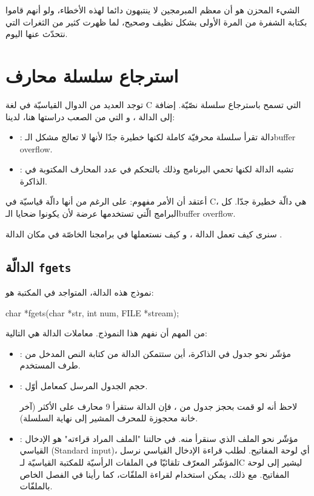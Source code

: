 الشيء المحزن هو أن معظم المبرمجين لا ينتبهون دائما لهذه الأخطاء، ولو أنهم قاموا بكتابة الشفرة من المرة الأولى بشكل نظيف وصحيح، لما ظهرت كثير من الثغرات التي نتحدّث عنها اليوم.

\section{استرجاع سلسلة محارف}

توجد العديد من الدوال القياسيّة في لغة
\textenglish{C}
التي تسمح باسترجاع سلسلة نصّيّة. إضافة إلى الدالة
،
و التي من الصعب دراستها هنا، لدينا:

\begin{itemize}
  \item {}:
دالة تقرأ سلسلة محرفيّة كاملة لكنها خطيرة جدّا لأنها لا تعالج مشكل الـ\textenglish{buffer overflow}.
  \item {}:
 تشبه الدالة
لكنها تحمي البرنامج وذلك بالتحكم في عدد المحارف المكتوبة في الذاكرة.
\end{itemize}

أعتقد أن الأمر مفهوم: على الرغم من أنها دالّة قياسيّة في \textenglish{C}،
هي دالّة خطيرة  جدّا. كل البرامج الّتي تستخدمها عرضة لأن يكونوا ضحايا الـ\textenglish{buffer overflow}.

سنرى كيف تعمل الدالة
،
و كيف نستعملها في برامجنا الخاصّة في مكان الدالة
.

\subsection{الدالّة \texttt{fgets}}

نموذج هذه الدالة، المتواجد في المكتبة
هو:

\begin{Csource}
char *fgets(char *str, int num, FILE *stream);
\end{Csource}

من المهم أن نفهم هذا النموذج. معاملات الدالة هي التالية:

\begin{itemize}
  \item {}:
مؤشّر نحو جدول في الذاكرة، أين ستتمكن الدالة من كتابة النص المدخل من طرف المستخدم.
  \item {}:
حجم الجدول
المرسل كمعامل أوّل.

لاحظ أنه لو قمت بحجز جدول من
،
فإن الدالة
ستقرأ 9 محارف على الأكثر (آخر خانة محجوزة للمحرف
المشير إلى نهاية السلسلة).
  \item {}:
مؤشّر نحو الملف الذي سنقرأ منه. في حالتنا "الملف المراد قراءته" هو الإدخال القياسي
(\textenglish{Standard input})،
أي لوحة المفاتيح. لطلب قراءة الإدخال القياسي نرسل المؤشّر
المعرّف تلقائيّا في الملفات الرأسيّة للمكتبة القياسيّة لـ\textenglish{C}
ليشير إلى لوحة المفاتيح. مع ذلك، يمكن استخدام
لقراءة الملفّات، كما رأينا في الفصل الخاص بالملفّات.
\end{itemize}

